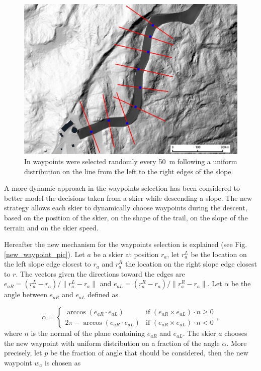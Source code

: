 \documentclass[12pt,a4paper,twoside]{book}
\newcommand{\norm}[1]{\lVert#1\rVert}
\begin{document}
\begin{figure}
  \begin{center}
    \includegraphics[width=\textwidth]{images/waypoint_line.eps}
    \caption{In \cite{hol2012} waypoints were selected randomly every 50~m following a uniform distribution on the line from the left to the right edges of the slope.}\label{waypoints_old_pic}
  \end{center}
\end{figure}

A more dynamic approach in the waypoints selection has been considered to better model the decisions taken from a skier while descending a slope. The new strategy allows each skier to dynamically choose waypoints during the descent, based on the position of the skier, on the shape of the trail, on the slope of the terrain and on the skier speed.

Hereafter the new mechanism for the waypoints selection is explained (see Fig.\ref{new_waypoint_pic}). Let $a$ be a skier at position $r_a$, let $r_a^L$ be the location on the left slope edge closest to $r_a$ and $r_a^R$ the location on the right slope edge closest to $r$. The vectors given the directions toward the edges are $e_{aR}=\left(r_a^L-r_a\right)/\norm{r_a^L-r_a}$ and $e_{aL}=\left(r_a^R-r_a\right)/\norm{r_a^R-r_a}$. Let $\alpha$ be the angle between $e_{aR}$ and $e_{aL}$ defined as

\begin{equation}
\alpha=\begin{cases}
  \arccos(e_{aR} \cdot e_{aL}) & \text{if } (e_{aR} \times e_{aL})\cdot n \ge 0 \\
  2\pi-\arccos(e_{aR} \cdot e_{aL}) & \text {if } (e_{aR} \times e_{aL})\cdot n < 0
\end{cases},
\end{equation}
where $n$ is the normal of the plane containing $e_{aR}$ and $e_{aL}$. The skier $a$ chooses the new waypoint with uniform distribution on a fraction of the angle $\alpha$. More precisely, let $p$ be the fraction of angle that should be considered, then the new waypoint $w_a$ is chosen as
\end{document}
